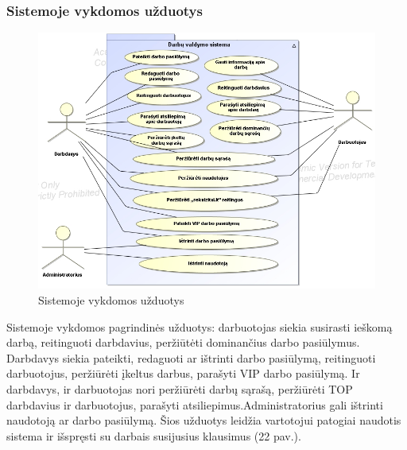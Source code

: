 \documentclass{VUMIFPSkursinis}
\begin{document}
\subsubsection{Sistemoje vykdomos užduotys}
\begin{figure}[H]
\centering
\includegraphics[width=\linewidth, frame]{img/usecase1.png}
\caption{Sistemoje vykdomos užduotys}
\end{figure}
Sistemoje vykdomos pagrindinės užduotys: darbuotojas siekia susirasti ieškomą darbą, reitinguoti darbdavius, peržiūtėti dominančius darbo pasiūlymus. Darbdavys siekia pateikti, redaguoti ar ištrinti darbo pasiūlymą, reitinguoti darbuotojus, peržiūrėti įkeltus darbus, parašyti VIP darbo pasiūlymą. Ir darbdavys, ir darbuotojas nori peržiūrėti darbų sąrašą, peržiūrėti TOP darbdavius ir darbuotojus, parašyti atsiliepimus.Administratorius gali ištrinti naudotoją ar darbo pasiūlymą. Šios užduotys leidžia vartotojui patogiai naudotis sistema ir išspręsti su darbais susijusius klausimus (22 pav.).
\newpage
\end{document}

